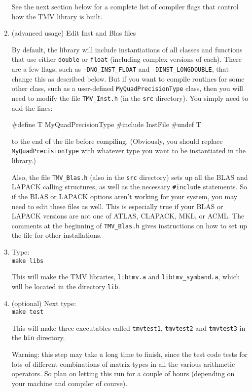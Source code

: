 \documentclass[twoside,letterpaper,11pt]{article}
\renewcommand{\tt}[1]{{\lstinline {#1}}}
\begin{document}
\begin{enumerate}
See the next section below for a complete list of compiler flags that control how the TMV library is built.

\item{(advanced usage) Edit Inst and Blas files}

By default, the library will include instantiations of all classes and 
functions
that use either \texttt{double} or \texttt{float} (including complex versions of each).  
There are a few flags, such as 
\texttt{-DNO\_INST\_FLOAT} and \texttt{-DINST\_LONGDOUBLE},
that change this as described below.  
But if you want to compile routines for some other class, such as a user-defined
\texttt{MyQuadPrecisionType} class, then you will need to modify the file \texttt{TMV\_Inst.h} 
(in the \texttt{src} directory).
You simply need to add the lines:
\begin{tmvcode}
#define T MyQuadPrecisionType
#include InstFile
#undef T
\end{tmvcode}
to the end of the file before compiling.  (Obviously, you should
replace \tt{MyQuadPrecisionType} with whatever
type you want to be instantiated in the library.)

Also, the file \texttt{TMV\_Blas.h} (also in the \texttt{src} directory)
sets up all the BLAS and LAPACK calling structures,
as well as the necessary \texttt{\#include} statements.  
So if the BLAS or LAPACK options aren't working 
for your system, you may need to edit these files as well.
This is especially true if your BLAS or LAPACK versions are not one of 
ATLAS, CLAPACK, MKL, or ACML.  The comments at the beginning of 
\texttt{TMV\_Blas.h} gives instructions on how to set up the file for 
other installations.

\item
Type: \\
\texttt{make libs}

This will make the TMV libraries, \texttt{libtmv.a} and \texttt{libtmv\_symband.a},
which will be located in the directory \texttt{lib}.

\item
(optional) Next type:\\
\texttt{make test}

This will make three executables called \texttt{tmvtest1}, 
\texttt{tmvtest2} and \texttt{tmvtest3} in the \texttt{bin} directory.

Warning: this step may take a long time to finish, since
the test code tests
for lots of different combinations of matrix types in all the various 
arithmetic operators.
So plan on letting this run
for a couple of hours (depending on your machine and compiler of course).


\end{enumerate}
\end{document}
